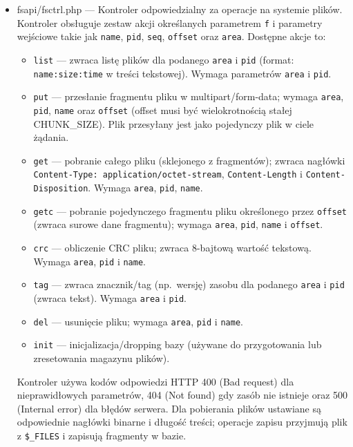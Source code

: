 \documentclass[12pt,a4paper]{article}
\begin{document}
\begin{itemize}
    \item fsapi/fsctrl.php --- Kontroler odpowiedzialny za operacje na systemie plików. Kontroler obsługuje zestaw akcji określanych parametrem \texttt{f} i parametry wejściowe takie jak \texttt{name}, \texttt{pid}, \texttt{seq}, \texttt{offset} oraz \texttt{area}. Dostępne akcje to:
          \begin{itemize}
              \item \texttt{list} --- zwraca listę plików dla podanego \texttt{area} i \texttt{pid} (format: \texttt{name:size:time} w treści tekstowej). Wymaga parametrów \texttt{area} i \texttt{pid}.
              \item \texttt{put} --- przesłanie fragmentu pliku w multipart/form-data; wymaga \texttt{area}, \texttt{pid}, \texttt{name} oraz \texttt{offset} (offset musi być wielokrotnością stałej CHUNK\_SIZE). Plik przesyłany jest jako pojedynczy plik w ciele żądania.
              \item \texttt{get} --- pobranie całego pliku (sklejonego z fragmentów); zwraca nagłówki \texttt{Content-Type: application/octet-stream}, \texttt{Content-Length} i \texttt{Content-Disposition}. Wymaga \texttt{area}, \texttt{pid}, \texttt{name}.
              \item \texttt{getc} --- pobranie pojedynczego fragmentu pliku określonego przez \texttt{offset} (zwraca surowe dane fragmentu); wymaga \texttt{area}, \texttt{pid}, \texttt{name} i \texttt{offset}.
              \item \texttt{crc} --- obliczenie CRC pliku; zwraca 8-bajtową wartość tekstową. Wymaga \texttt{area}, \texttt{pid} i \texttt{name}.
              \item \texttt{tag} --- zwraca znacznik/tag (np.\ wersję) zasobu dla podanego \texttt{area} i \texttt{pid} (zwraca tekst). Wymaga \texttt{area} i \texttt{pid}.
              \item \texttt{del} --- usunięcie pliku; wymaga \texttt{area}, \texttt{pid} i \texttt{name}.
              \item \texttt{init} --- inicjalizacja/dropping bazy (używane do przygotowania lub zresetowania magazynu plików).
          \end{itemize}
          Kontroler używa kodów odpowiedzi HTTP 400 (Bad request) dla nieprawidłowych parametrów, 404 (Not found) gdy zasób nie istnieje oraz 500 (Internal error) dla błędów serwera. Dla pobierania plików ustawiane są odpowiednie nagłówki binarne i długość treści; operacje zapisu przyjmują plik z \texttt{\$\_FILES} i zapisują fragmenty w bazie.




\end{itemize}
\end{document}
